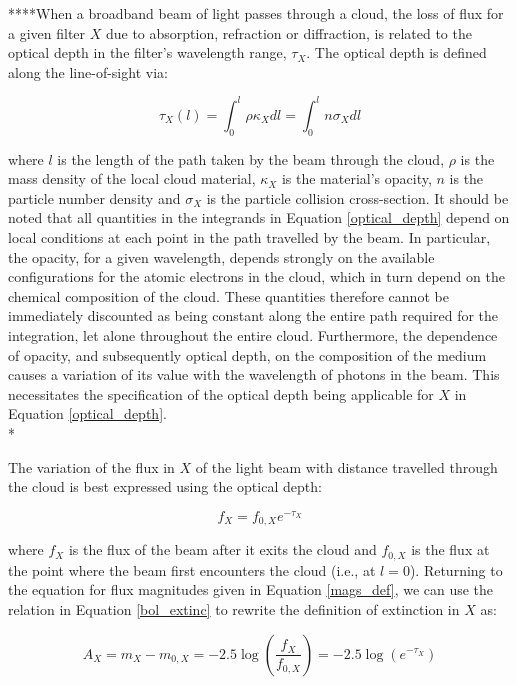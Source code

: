 ****When a broadband beam of light passes through a cloud, the loss of flux for a given filter $X$ due to absorption, refraction or diffraction, is related to the optical depth in the filter's wavelength range, $\tau_{X}$. The optical depth is defined along the line-of-sight via:

\begin{equation}
\tau_{X}(l) = \int_{0}^{l} \rho \kappa_{X} dl = \int_{0}^{l} n \sigma_{X} dl
\label{optical_depth}
\end{equation}

where $l$ is the length of the path taken by the beam through the cloud, $\rho$ is the mass density of the local cloud material, $\kappa_{X}$ is the material's opacity, $n$ is the particle number density and $\sigma_{X}$ is the particle collision cross-section. It should be noted that all quantities in the integrands in Equation \ref{optical_depth} depend on local conditions at each point in the path travelled by the beam. In particular, the opacity, for a given wavelength, depends strongly on the available configurations for the atomic electrons in the cloud, which in turn depend on the chemical composition of the cloud. These quantities therefore cannot be immediately discounted as being constant along the entire path required for the integration, let alone throughout the entire cloud. Furthermore, the dependence of opacity, and subsequently optical depth, on the composition of the medium causes a variation of its value with the wavelength of photons in the beam. This necessitates the specification of the optical depth being applicable for $X$ in Equation \ref{optical_depth}.\\*

The variation of the flux in $X$ of the light beam with distance travelled through the cloud is best expressed using the optical depth:

\begin{equation}
f_{X} = f_{0,X} e^{-\tau_{X}}
\label{flux_loss_optical_depth}
\end{equation}

where $f_{X}$ is the flux of the beam after it exits the cloud and $f_{0,X}$ is the flux at the point where the beam first encounters the cloud (i.e., at $l = 0$). Returning to the equation for flux magnitudes given in Equation \ref{mags_def}, we can use the relation in Equation \ref{bol_extinc} to rewrite the definition of extinction in $X$ as:

\begin{equation}
A_{X} = m_{X} - m_{0,X} = -2.5\log\left(\frac{f_{X}}{f_{0,X}}\right) = -2.5\log(e^{-\tau_{X}})
\label{ext_optical_depth}
\end{equation}

